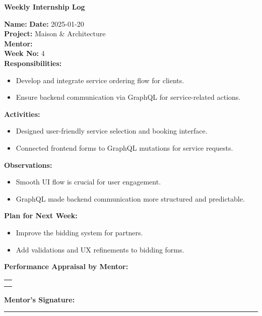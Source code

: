 \begin{center}
    \bfseries Weekly Internship Log
\end{center}

\noindent
\textbf{Name:}  \hfill \textbf{Date:} 2025-01-20 \\
\textbf{Project:} Maison \& Architecture \hfill \\
\textbf{Mentor:}  \\
\textbf{Week No:} 4 \\

\noindent
\textbf{Responsibilities:}
\begin{itemize}
    \item Develop and integrate service ordering flow for clients.
    \item Ensure backend communication via GraphQL for service-related actions.
\end{itemize}

\noindent
\textbf{Activities:}
\begin{itemize}
    \item Designed user-friendly service selection and booking interface.
    \item Connected frontend forms to GraphQL mutations for service requests.
\end{itemize}

\noindent
\textbf{Observations:}
\begin{itemize}
    \item Smooth UI flow is crucial for user engagement.
    \item GraphQL made backend communication more structured and predictable.
\end{itemize}

\noindent
\textbf{Plan for Next Week:}
\begin{itemize}
    \item Improve the bidding system for partners.
    \item Add validations and UX refinements to bidding forms.
\end{itemize}

\noindent
\textbf{Performance Appraisal by Mentor:} \\
\begin{table}[h]
    \centering
    \noindent
    \begin{tabularx}{\textwidth} { 
        | >{\centering\arraybackslash}X| }

        \hline
        \\ \\
        \hline
    \end{tabularx}
\end{table}

\vspace{2em}
\noindent
\textbf{Mentor’s Signature:} \\
\rule{0.4\textwidth}{0.5pt}
